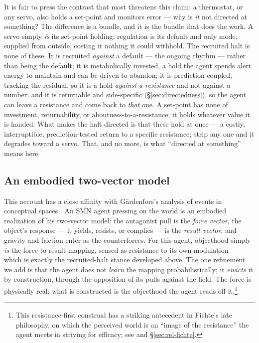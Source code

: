 \documentclass{article}
\begin{document}
It is fair to press the contrast that most threatens this claim: a
thermostat, or any servo, also holds a set-point and monitors error ---
why is \emph{it} not directed at something?  The difference is a bundle,
and it is the bundle that does the work.  A servo simply \emph{is} its
set-point holding: regulation is its default and only mode, supplied from
outside, costing it nothing it could withhold.  The recruited halt is none
of these.  It is recruited \emph{against} a default --- the ongoing rhythm
--- rather than being the default; it is metabolically invested, a hold
the agent spends alert energy to maintain and can be driven to abandon; it
is prediction-coupled, tracking the residual, so it is a hold \emph{against
a resistance} and not against a number; and it is returnable and
side-specific (\S\ref{sec:directedness}), so the agent can leave a
resistance and come back to \emph{that} one.  A set-point has none of
investment, returnability, or aboutness-to-a-resistance; it holds whatever
value it is handed.  What makes the halt directed is that these hold at
once --- a costly, interruptible, prediction-tested return to a specific
resistance; strip any one and it degrades toward a servo.  That, and no
more, is what ``directed at something'' means here.

\subsection{An embodied two-vector model}\label{sec:direct-twovector}

This account has a close affinity with G\"ardenfors's analysis of events
in conceptual spaces \citep{Gardenfors2020Events,Gardenfors2019Robot}.
An SMN agent pressing on the world is an embodied realization of his
two-vector model: the antagonist pull is the \emph{force vector}, the
object's response --- it yields, resists, or complies --- is the
\emph{result vector}, and gravity and friction enter as the
counterforces.  For this agent, objecthood simply \emph{is} the
force-to-result mapping, sensed as resistance to its own modulation ---
which is exactly the recruited-halt stance developed above.  The one
refinement we add is that the agent does not \emph{learn} the mapping
probabilistically; it \emph{enacts} it by construction, through the
opposition of its pulls against the field.  The force is physically real;
what is constructed is the objecthood the agent reads off it.\footnote{This
resistance-first construal has a striking antecedent in Fichte's late
philosophy, on which the perceived world is an ``image of the resistance''
the agent meets in striving for efficacy; see
\citet{Gruneberg2026GeneratingI} and \S\ref{sec:rel-fichte}.}
\end{document}

